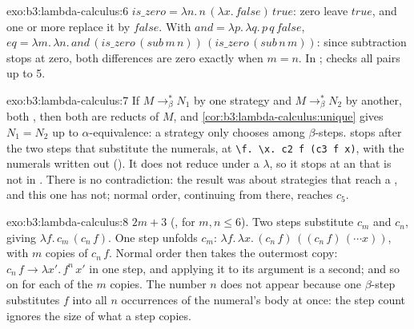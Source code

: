 \begin{solution}{exo:b3:lambda-calculus:6}
$\mathit{is\_zero} = \lambda n.\,n\,(\lambda x.\,\mathit{false})\,\mathit{true}$: zero  leave $\mathit{true}$, and one or more replace it by $\mathit{false}$. With $\mathit{and} = \lambda p.\,\lambda q.\,p\,q\,\mathit{false}$, $\mathit{eq} = \lambda m.\,\lambda n.\,\mathit{and}\,(\mathit{is\_zero}\,(\mathit{sub}\,m\,n))\,(\mathit{is\_zero}\,(\mathit{sub}\,n\,m))$: since subtraction stops at zero, both differences are zero exactly when $m = n$. In ;  checks all pairs up to 5.
\end{solution}

\begin{solution}{exo:b3:lambda-calculus:7}
If $M \to_\beta^* N_1$ by one strategy and $M \to_\beta^* N_2$ by another, both , then both are reducts of $M$, and \cref{cor:b3:lambda-calculus:unique} gives $N_1 = N_2$ up to $\alpha$-equivalence: a strategy only chooses among $\beta$-steps.  stops after the two steps that substitute the numerals, at \texttt{\textbackslash{}f.\ \textbackslash{}x.\ c2 f (c3 f x)}, with the numerals written out (). It does not reduce under a $\lambda$, so it stops at an  that is not in . There is no contradiction: the result was about strategies that reach a , and this one has not; normal order, continuing from there, reaches $c_5$.
\end{solution}

\begin{solution}{exo:b3:lambda-calculus:8}
$2m + 3$ (, for $m, n \le 6$). Two steps substitute $c_m$ and $c_n$, giving $\lambda f.\,c_m\,(c_n\,f)$. One step unfolds $c_m$: $\lambda f.\,\lambda x.\,(c_n\,f)\,((c_n\,f)\,(\cdots x))$, with $m$ copies of $c_n\,f$. Normal order then takes the outermost copy: $c_n\,f \to \lambda x'.\,f^n\,x'$ in one step, and applying it to its argument is a second; and so on for each of the $m$ copies. The number $n$ does not appear because one $\beta$-step substitutes $f$ into all $n$ occurrences of the numeral's body at once: the step count ignores the size of what a step copies.
\end{solution}

